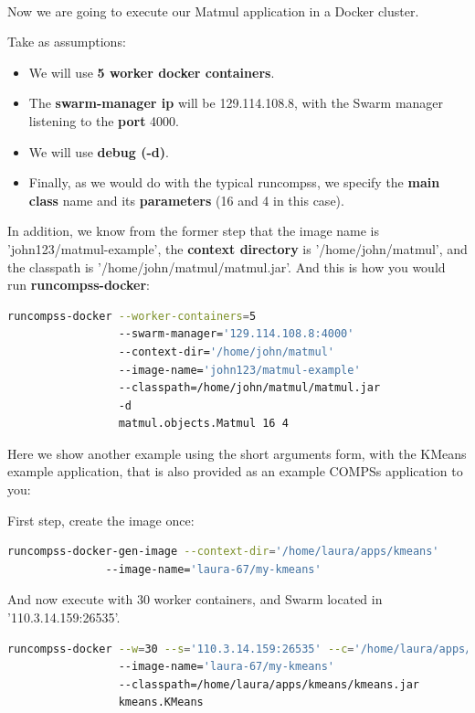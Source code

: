 ~ \newline

Now we are going to execute our Matmul application in a Docker cluster.

Take as assumptions:
\begin{itemize}  
\item We will use \textbf{5 worker docker containers}.
\item The \textbf{swarm-manager ip} will be 129.114.108.8, with the Swarm manager listening to the \textbf{port} 4000.
\item We will use \textbf{debug (-d)}.
\item Finally, as we would do with the typical runcompss, we specify the \textbf{main class} name and its \textbf{parameters} (16 and 4 in this case).
\end{itemize}

In addition, we know from the former step that the image name is 'john123/matmul-example', 
the \textbf{context directory} is '/home/john/matmul', and the classpath is '/home/john/matmul/matmul.jar'.
And this is how you would run \textbf{runcompss-docker}:

\begin{lstlisting}[language=bash]
runcompss-docker --worker-containers=5
                 --swarm-manager='129.114.108.8:4000'
                 --context-dir='/home/john/matmul'
                 --image-name='john123/matmul-example'
                 --classpath=/home/john/matmul/matmul.jar
                 -d
                 matmul.objects.Matmul 16 4
\end{lstlisting}

Here we show another example using the short arguments form, with the KMeans example application, 
that is also provided as an example COMPSs application to you:

First step, create the image once:
\begin{lstlisting}[language=bash]
runcompss-docker-gen-image --context-dir='/home/laura/apps/kmeans'
			   --image-name='laura-67/my-kmeans'
\end{lstlisting}

And now execute with 30 worker containers, and Swarm located in '110.3.14.159:26535'.
\begin{lstlisting}[language=bash]
runcompss-docker --w=30 --s='110.3.14.159:26535' --c='/home/laura/apps/kmeans' 
                 --image-name='laura-67/my-kmeans'
                 --classpath=/home/laura/apps/kmeans/kmeans.jar
                 kmeans.KMeans
\end{lstlisting}           

